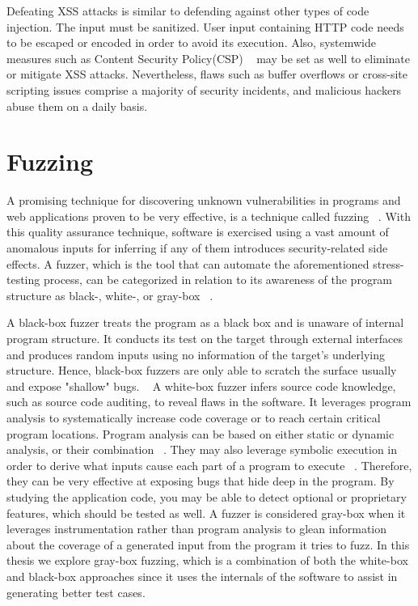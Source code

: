 Defeating XSS attacks is similar to defending against other types of code injection.
The input must be sanitized. User input containing HTTP code needs to be escaped or encoded in order to avoid its execution. Also, systemwide measures
such as Content Security Policy(CSP) ~\cite{csp_def} may be set as well to eliminate or mitigate XSS attacks. Nevertheless, flaws such as buffer overflows or cross-site scripting issues comprise a majority of security incidents, and malicious hackers abuse them on a daily basis. 

\section{Fuzzing}
A promising technique for discovering unknown vulnerabilities in
programs and web applications proven to be very effective, is a technique called fuzzing ~\cite{fuzzing_def}.
With this quality assurance technique, software is exercised using a vast amount of anomalous inputs for inferring if any of them introduces security-related side effects. A fuzzer, which is the tool that can automate the aforementioned stress-testing process, can be categorized in relation to its awareness of the program structure as black-, white-, or gray-box ~\cite{fuzzing_book}. 

A black-box fuzzer treats the program as a black box and is unaware of
internal program structure. It conducts its test on the target through external
interfaces and produces random inputs using no information of the target's underlying structure. Hence,  black-box fuzzers are only able to scratch the surface usually and expose "shallow" bugs. ~\cite{fuzzing_owasp}
A white-box fuzzer infers source code knowledge, such as source code auditing, to reveal
flaws in the software. It leverages program analysis to systematically
increase code coverage or to reach certain critical program locations. Program analysis can be based on either static or dynamic analysis, or their combination ~\cite{program_analysis_book}. They may also leverage symbolic execution in order to derive what inputs cause each part of a program to execute ~\cite{symbolic_exe}. Therefore, they can be very effective at exposing bugs that hide deep in the program. By studying the application code, you may be able to detect optional or proprietary features, which should be tested as well.
A fuzzer is considered gray-box when it leverages instrumentation rather than program analysis to glean information about the coverage of a generated input from the program it tries to fuzz. In this thesis we explore gray-box fuzzing, which is a combination of both the white-box and black-box approaches since it uses the internals of the software to assist in generating better test cases.

